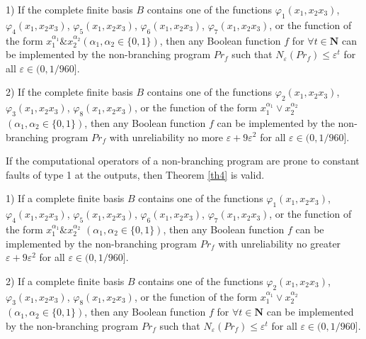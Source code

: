 \documentclass[
11pt,%
tightenlines,%
twoside,%
onecolumn,%
nofloats,%
nobibnotes,%
nofootinbib,%
superscriptaddress,%
noshowpacs,%
centertags]%
{revtex4}
\begin{document}
\begin{theorem}\label{th3}
         1) If the complete finite basis $B$ contains one of the functions $\varphi_1(x_1, x_2 x_3)$, $\varphi_4(x_1, x_2 x_3)$, $\varphi_5(x_1, x_2 x_3)$, $\varphi_6(x_1, x_2 x_3)$, $\varphi_7(x_1, x_2 x_3)$, or the function of the form $x_1^{\alpha_1}\& x_2^{\alpha_2}$$(\alpha_1, \alpha_2 \in \{0, 1\})$, then any Boolean function $f$ for $\forall t \in \mathbf{N}$ can be implemented by the non-branching program $Pr_f$ such that $N_\varepsilon(Pr_f)\leq \varepsilon^t$ for all $\varepsilon\in (0, 1/960]$.

         2) If the complete finite basis $B$ contains one of the functions $\varphi_2(x_1, x_2 x_3)$, $\varphi_3(x_1, x_2 x_3)$, $\varphi_8(x_1, x_2 x_3)$, or the function of the form $x_1^{\alpha_1}\vee x_2^{\alpha_2}$$(\alpha_1, \alpha_2 \in \{0, 1\})$, then any Boolean function $f$ can be implemented by the non-branching program $Pr_f$ with unreliability no more $\varepsilon+9\varepsilon^2$ \linebreak for all $\varepsilon\in (0, 1/960]$.
\end{theorem}

If the computational operators of a non-branching program are prone to constant faults of type 1 at the outputs, then Theorem \ref{th4} is valid.

\begin{theorem}\label{th4}
                 1) If a complete finite basis $B$ contains one of the functions $\varphi_1(x_1, x_2 x_3)$, $\varphi_4(x_1, x_2 x_3)$, $\varphi_5(x_1, x_2 x_3)$, $\varphi_6(x_1, x_2 x_3)$, $\varphi_7(x_1, x_2 x_3)$, or the function of the form $x_1^{\alpha_1}\& x_2^{\alpha_2}$ $(\alpha_1, \alpha_2 \in \{0, 1\})$, then any Boolean function $f$ can be implemented by the non-branching program $Pr_f$ with unreliability no greater $\varepsilon+9\varepsilon^2$   for all $\varepsilon\in (0, 1/960]$.

                 2) If a complete finite basis $B$ contains one of the functions $\varphi_2(x_1, x_2 x_3)$, $\varphi_3(x_1, x_2 x_3)$, $\varphi_8(x_1, x_2 x_3)$, or the function of the form $x_1^{\alpha_1}\vee x_2^{\alpha_2}$ $(\alpha_1, \alpha_2 \in \{0, 1\})$, then any Boolean function $f$ for $\forall t \in \mathbf{N}$ can be implemented by the non-branching program $Pr_f$ such that $N_\varepsilon(Pr_f)\leq \varepsilon^t$  \linebreak for all $\varepsilon\in (0, 1/960]$.
\end{theorem}
\end{document}
